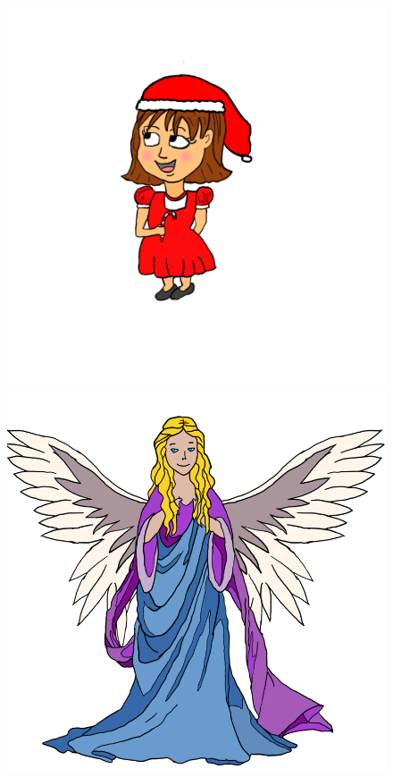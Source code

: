 \begin{figure}[htbp] \centering
\begin{minipage}[b]{0.45\textwidth} \centering
\includegraphics[width=1.00\textwidth]{Pictures/Design/PixieGirl} %
\end{minipage} \hfill
\begin{minipage}[b]{0.45\textwidth} \centering
\includegraphics[width=1.00\textwidth]{Pictures/Design/Angel} %

\end{minipage}
\end{figure}
